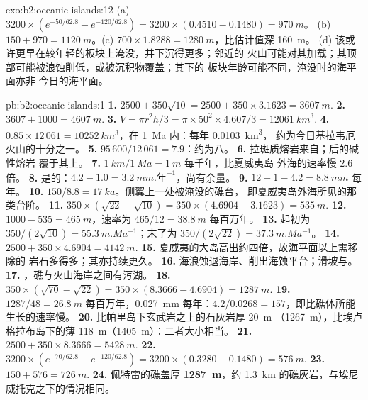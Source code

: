 \begin{solution}{exo:b2:oceanic-islands:12}
(a) $3200\times(e^{-50/62.8} - e^{-120/62.8}) = 3200\times(0.4510 - 0.1480) = \qty{970}{m}$。
(b) $150 + 970 = \qty{1120}{m}$。(c) $700\times1.8288 = \qty{1280}{m}$，比估计值深 \qty{160}{m}。
(d) 该或许更早在较年轻的板块上淹没，并下沉得更多；邻近的
火山可能对其加载；其顶部可能被浪蚀削低，或被沉积物覆盖；其下的
板块年龄可能不同，淹没时的海平面亦非
今日的海平面。
\end{solution}

\begin{solution}{pb:b2:oceanic-islands:1}
\textbf{1.} $2500 + 350\sqrt{10} = 2500 + 350\times3.1623 = \qty{3607}{m}$.
\textbf{2.} $3607 + 1000 = \qty{4607}{m}$.
\textbf{3.} $V = \pi r^2h/3 = \pi\times50^2\times4.607/3 = \qty{12061}{km^3}$.
\textbf{4.} $0.85\times12\,061 = \qty{10252}{km^3}$，在 \qty{1}{Ma} 内：每年 \qty{0.0103}{km^3}，
约为今日基拉韦厄火山的十分之一。
\textbf{5.} $95\,600/12\,061 = 7.9$：约为八。
\textbf{6.} 拉斑质熔岩来自；后的碱性熔岩
覆于其上。
\textbf{7.} $\qty{1}{km}/\qty{1}{Ma} = \qty{1}{m}$ 每千年，比夏威夷岛
外海的速率慢 2.6 倍。
\textbf{8.} 是的：$4.2 - 1.0 = \qty{3.2}{mm.\text{年}^{-1}}$，尚有余量。
\textbf{9.} $12 + 1 - 4.2 = \qty{8.8}{mm}$ 每年。
\textbf{10.} $150/8.8 = \qty{17}{ka}$。侧翼上一处被淹没的礁台，
即夏威夷岛外海所见的那类台阶。
\textbf{11.} $350\times(\sqrt{22} - \sqrt{10}) = 350\times(4.6904 - 3.1623) = \qty{535}{m}$.
\textbf{12.} $1000 - 535 = \qty{465}{m}$，速率为 $465/12 = \qty{38.8}{m}$ 每百万年。
\textbf{13.} 起初为 $350/(2\sqrt{10}) = \qty{55.3}{m.Ma^{-1}}$；末了为 $350/(2\sqrt{22}) =
\qty{37.3}{m.Ma^{-1}}$。
\textbf{14.} $2500 + 350\times4.6904 = \qty{4142}{m}$.
\textbf{15.} 夏威夷的大岛高出约四倍，故海平面以上需移除的
岩石多得多；其亦持续更久。
\textbf{16.} 海浪蚀退海岸、削出海蚀平台；滑坡与。
\textbf{17.} ，礁与火山海岸之间有泻湖。
\textbf{18.} $350\times(\sqrt{70} - \sqrt{22}) = 350\times(8.3666 - 4.6904) = \qty{1287}{m}$.
\textbf{19.} $1287/48 = \qty{26.8}{m}$ 每百万年，\qty{0.027}{mm} 每年：$4.2/0.0268 =
157$，即比礁体所能生长的速率慢。
\textbf{20.} 比帕里岛下玄武岩之上的石灰岩厚 \qty{20}{m}
（\qty{1267}{m}），比埃卢格拉布岛下的薄 \qty{118}{m}（\qty{1405}{m}）：二者大小相当。
\textbf{21.} $2500 + 350\times8.3666 = \qty{5428}{m}$.
\textbf{22.} $3200\times(e^{-70/62.8} - e^{-120/62.8}) = 3200\times(0.3280 - 0.1480) =
\qty{576}{m}$.
\textbf{23.} $150 + 576 = \qty{726}{m}$.
\textbf{24.} 佩特雷的礁盖厚 \textbf{\qty{1287}{m}}，约 \qty{1.3}{km}
的礁灰岩，与埃尼威托克之下的情况相同。
\end{solution}
